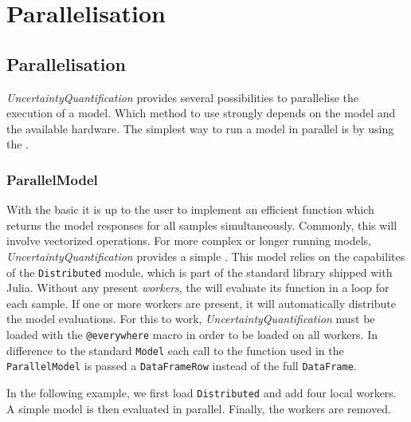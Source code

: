\chapter{Parallelisation}


\section{Parallelisation}



\label{3364646822760622237}{}


\emph{UncertaintyQuantification} provides several possibilities to parallelise the execution of a model. Which method to use strongly depends on the model and the available hardware. The simplest way to run a model in parallel is by using the .



\subsection{ParallelModel}



\label{1757741936032894606}{}


With the basic  it is up to the user to implement an efficient function which returns the model responses for all samples simultaneously. Commonly, this will involve vectorized operations. For more complex or longer running models, \emph{UncertaintyQuantification} provides a simple . This model relies on the capabilites of the \texttt{Distributed} module, which is part of the standard library shipped with Julia. Without any present \emph{workers}, the  will evaluate its function in a loop for each sample. If one or more workers are present, it will automatically distribute the model evaluations. For this to work, \emph{UncertaintyQuantification} must be loaded with the \texttt{@everywhere} macro in order to be loaded on all workers. In difference to the standard \texttt{Model} each call to the function used in the  \texttt{ParallelModel} is passed a \texttt{DataFrameRow} instead of the full \texttt{DataFrame}.



In the following example, we first load \texttt{Distributed} and add four local workers. A simple model is then evaluated in parallel. Finally, the workers are removed.




